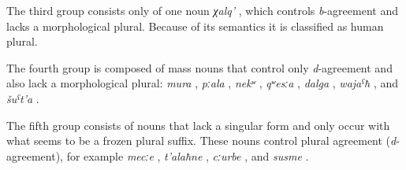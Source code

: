 The third group consists only of one noun \textit{χalq'} , which controls \textit{b}-agreement and lacks a morphological plural. Because of its semantics it is classified as human plural.  

The fourth group is composed of mass nouns that control only \textit{d}-agreement and also lack a morphological plural: \textit{mura} , \textit{pːala} , \textit{nekʷ} , \textit{qʷesːa} , \textit{dalga} , \textit{wajaˁħ} , and \textit{šuˁt'a} .

The fifth group consists of nouns that lack a singular form and only occur with what seems to be a frozen plural suffix. These nouns control plural agreement (\textit{d}-agreement), for example \textit{mecːe} , \textit{t'alaħne} , \textit{cːurbe} , and \textit{susme} .

